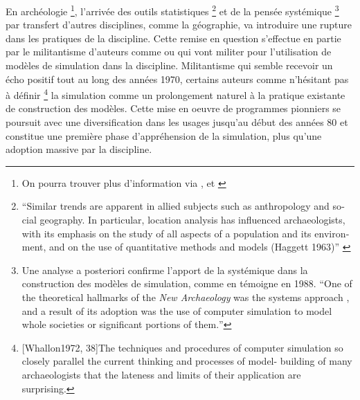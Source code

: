 En archéologie \footnote{On pourra trouver plus d'information via \autocite{Kohler2011}, et \autocite{Lake2013}}, l'arrivée des outils statistiques \footnote{\foreignquote{english}{Similar trends are apparent in allied subjects such as anthropology and social geography. In particular, location analysis has influenced archaeologists, with its emphasis on the study of all aspects of a population and its environment, and on the use of quantitative methods and models (Haggett 1963)} \autocite{Doran1970}} et de la pensée systémique \autocite{Flannery1968, Binford1968} \footnote{Une analyse a posteriori confirme l'apport de la systémique dans la construction des modèles de simulation, comme en témoigne \textcite{Aldenderfer1998} en 1988. \foreignquote{english}{One of the theoretical hallmarks of the \textit{New Archaeology} was the systems approach \autocite{Aldenderfer1991}, and a result of its adoption was the use of computer simulation to model whole societies or significant portions of them.}} par transfert d'autres disciplines, comme la géographie, va introduire une rupture dans les pratiques de la discipline. Cette remise en question s'effectue en partie par le militantisme d'auteurs comme \textcite{Clarke1968} ou \textcite{Doran1970} qui vont militer pour l'utilisation de modèles de simulation dans la discipline. Militantisme qui semble recevoir un écho positif tout au long des années 1970, certains auteurs comme \textcite[38]{Whallon1972} n'hésitant pas à définir \footnote{ [Whallon1972, 38]{The techniques and procedures of computer simulation so closely parallel the current thinking and processes of model- building of many archaeologists that the lateness and limits of their application are surprising.}} la simulation comme un prolongement naturel à la pratique existante de construction des modèles. Cette mise en oeuvre de programmes pionniers se poursuit avec une diversification dans les usages jusqu'au début des années 80 et constitue une première phase d'appréhension de la simulation, plus qu'une adoption massive par la discipline. \autocite{Lake2013}



